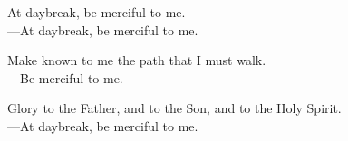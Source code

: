 \responsory

\noindent At daybreak, be merciful to me.\\
{\color{red}---\thinspace}At daybreak, be merciful to me.

\medskip\noindent Make known to me the path that I must walk.\\
{\color{red}---\thinspace}Be merciful to me.

\medskip\noindent Glory to the Father, and to the Son, and to the Holy Spirit.\\
{\color{red}---\thinspace}At daybreak, be merciful to me.